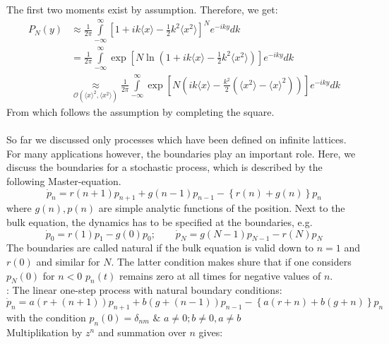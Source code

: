 The first two moments exist by assumption. Therefore, we get:
\begin{align*}
	P_N(y)&\approx\frac{1}{2\pi}\int\limits_{-\infty}^\infty\left[1+ik\langle x\rangle-\frac{1}{2}k^2\langle x^2\rangle\right]^Ne^{-iky}dk\\
	&=\frac{1}{2\pi}\int\limits_{-\infty}^\infty\exp\left[N\ln\left(1+ik\langle x\rangle-\frac{1}{2}k^2\langle x^2\rangle\right)\right]e^{-iky}dk\\
	&\underset{\mathcal{O}(\langle x\rangle ^2,\langle x^2\rangle)}{\approx}\frac{1}{2\pi}\int\limits_{-\infty}^\infty\exp\left[N\left(ik\langle x\rangle -\frac{k^2}{2}\left(\langle x^2\rangle -\langle x\rangle^2\right)\right)\right]e^{-iky}dk
\end{align*}
From which follows the assumption by completing the square.\vspace{0.5cm}\\
\textbf{\underline{}}\vspace{0.2cm}\\
So far we discussed only processes which have been defined on infinite lattices. For many applications however, the boundaries play an important role. Here, we discuss the boundaries for a stochastic process, which is described by the following Master-equation.
\begin{equation*}
	\dot{p}_n=r(n+1)p_{n+1}+g(n-1)p_{n-1}-\left\{r(n)+g(n)\right\}p_n
\end{equation*}
where $g(n),p(n)$ are simple analytic functions of the position. Next to the bulk equation, the dynamics has to be specified at the boundaries, e.g.
\begin{equation*}
	\dot{p}_0=r(1)p_1-g(0)p_0;\qquad \dot{p}_N=g(N-1)p_{N-1}-r(N)p_N
\end{equation*}
The boundaries are called natural if the bulk equation is valid down to $n=1$ and $r(0)$ and similar for $N$. The latter condition makes shure that if one considers $p_N(0)$ for $n<0$ $p_n(t)$ remains zero at all times for negative values of $n$.\vspace{0.1cm}\\
\underline{}: The linear one-step process with natural boundary conditions:
\begin{equation*}
	\dot{p}_n=a(r+(n+1))p_{n+1}+b(g+(n-1))p_{n-1}-\left\{a(r+n)+b(g+n)\right\}p_n
\end{equation*}
with the condition $p_n(0)=\delta_{nm}$ $\&$ $a\neq 0;b\neq 0, a\neq b$\\
Multiplikation by $z^n$ and summation over $n$ gives:
